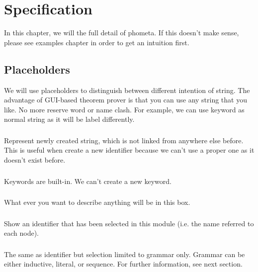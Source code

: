 

\chapter{Specification}

In this chapter, we will the full detail of phometa. If this doesn't make sense, please see examples chapter in order to get an intuition first.

\section{Placeholders}

We will use placeholders to distinguish between different intention of string. The advantage of GUI-based theorem prover is that you can use any string that you like. No more reserve word or name clash. For example, we can use keyword as normal string as it will be label differently.

\subsection{} Represent newly created string, which is not linked from anywhere else before. This is useful when create a new identifier because we can't use a proper one as it doesn't exist before.

\subsection{} Keywords are built-in. We can't create a new keyword.

\subsection{} What ever you want to describe anything will be in this box.

\subsection{} Show an identifier that has been selected in this module (i.e. the name referred to each node).

\subsection{} The same as identifier but selection limited to grammar only. Grammar can be either inductive, literal, or sequence. For further information, see next section.

